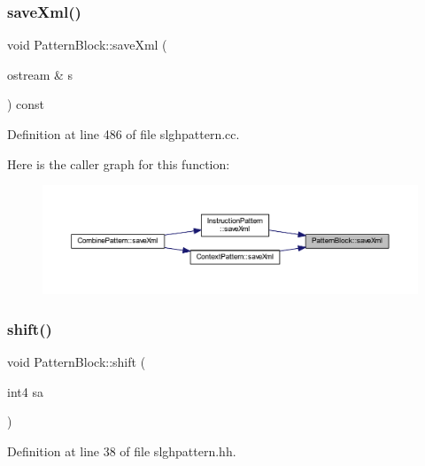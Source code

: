 \subsubsection{\texorpdfstring{saveXml()}{saveXml()}}
{\footnotesize\ttfamily void Pattern\+Block\+::save\+Xml (\begin{DoxyParamCaption}\item[{ostream \&}]{s }\end{DoxyParamCaption}) const}



Definition at line 486 of file slghpattern.\+cc.

Here is the caller graph for this function\+:
\nopagebreak
\begin{figure}[H]
\begin{center}
\leavevmode
\includegraphics[width=350pt]{class_pattern_block_ab0e34b5b191eaa74314a70762f1530fc_icgraph}
\end{center}
\end{figure}
\mbox{\label{class_pattern_block_ab159a1b0a1f22b8aae4bf17666a38aea}} 
\subsubsection{\texorpdfstring{shift()}{shift()}}
{\footnotesize\ttfamily void Pattern\+Block\+::shift (\begin{DoxyParamCaption}\item[{int4}]{sa }\end{DoxyParamCaption})\hspace{0.3cm}{\ttfamily [inline]}}



Definition at line 38 of file slghpattern.\+hh.

